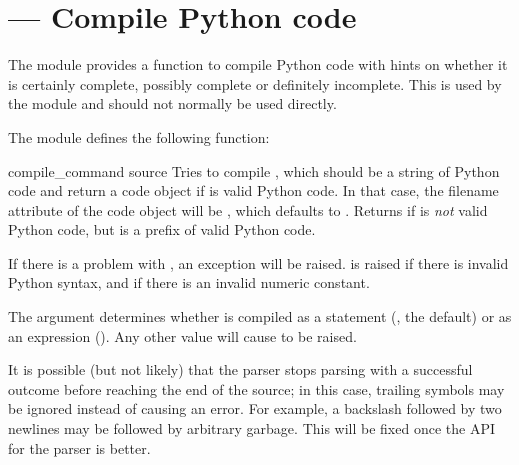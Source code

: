 \section{ ---
         Compile Python code}



The  module provides a function to compile Python code
with hints on whether it is certainly complete, possibly complete or
definitely incomplete.  This is used by the  module
and should not normally be used directly.

The  module defines the following function:

\begin{funcdesc}{compile_command}
                {source}
Tries to compile , which should be a string of Python
code and return a code object if  is valid
Python code. In that case, the filename attribute of the code object
will be , which defaults to .
Returns  if  is \emph{not} valid Python
code, but is a prefix of valid Python code.

If there is a problem with , an exception will be raised.
 is raised if there is invalid Python syntax,
and  if there is an invalid numeric
constant.

The  argument determines whether  is compiled
as a statement (, the default) or as an expression
().  Any other value will cause  to 
be raised.

It is possible (but not likely) that the parser stops parsing
with a successful outcome before reaching the end of the source;
in this case, trailing symbols may be ignored instead of causing an
error.  For example, a backslash followed by two newlines may be
followed by arbitrary garbage.  This will be fixed once the API
for the parser is better.
\end{funcdesc}
